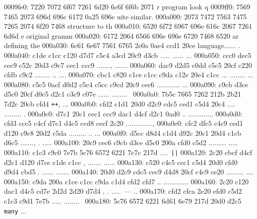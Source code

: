 \begin{bo
00010e0: 7865 647d 5c62 6567 696e 7b76 6572 6261  xed}
\begin{verba
00010f0: 7469 6d7d 0a20 2023 7479 7065 2074 6572  tim}
\begin{
0001c40: 7665 7262 6174 696d 7d0a 2020 236c 6574  verbatim}
\begin{boxe
00027a0: 647d 5c62 6567 696e 7b76 6572 6261 7469  d}
\begin{verbati
00027b0: 6d7d 0a20 2023 6c65 7420 696e 6669 7865  m}
\begin{v
0002c60: 6572 6261 7469 6d7d 0a20 2023 6c65 7420  erbatim}
\begin{
0002dc0: 7665 7262 6174 696d 7d0a 2020 236c 6574  verbatim}
\begin{boxed
0002f30: 7d5c 6265 6769 6e7b 7665 7262 6174 696d  }
\begin{verbatim
0002f40: 7d0a 2020 236c 6574 2068 6428 683a 3a74  }
\begin{v
0003e60: 6572 6261 7469 6d7d 0a20 2023 236f 7065  erbatim}
\begin{boxed
00042b0: 7d5c 6265 6769 6e7b 7665 7262 6174 696d  }
\begin{verbatim
00042c0: 7d0a 2020 2328 782c 7429 3b3b 0a20 202d  }
0009fe0: 7220 7072 6f67 7261 6d20 6c6f 6f6b 2071  r program look q
0009ff0: 7569 7465 2073 696d 696c 6172 0a25 696e  uite similar.%
000a000: 2073 7472 7563 7475 7265 2074 6f20 7468   structure to th
000a010: 6520 6f72 6967 696e 616c 2067 7261 6d6d  e original gramm
000a020: 6172 2064 6566 696e 696e 6720 7468 6520  ar defining the 
000a030: 6c61 6e67 7561 6765 2e0a 0ae4 ccd1 20ce  language...... .
000a040: c1de c1cc c120 d7d7 c5c4 a3cd 20c9 d3cb  ..... ...... ...
000a050: ccc0 dec5 cec9 c52c 20d3 c9c7 cec1 ccc9  ......., .......
000a060: dac9 d2d5 c0dd c5c5 20cf c220 cfdb c9c2  ........ .. ....
000a070: cbc1 c820 c1ce c1cc c9da c12e 20e4 c1cc  ... ........ ...
000a080: c5c5 0acf d0d2 c5c4 c5cc c9cd 20c9 cec6  ............ ...
000a090: c9cb d3ce d5c0 20cf d0c5 d2c1 c3c9 c07e  ...... ........~
000a0a0: 7b5c 7665 7262 212b 2b21 7d2c 20cb cfd4  {\verb!++!}, ...
000a0b0: cfd2 c1d1 20d0 d2c9 cdc5 ced1 c5d4 20c4  .... ......... .
000a0c0: d7c1 20c1 cec1 ccc9 dac1 d4cf d2c1 0ad0  .. .............
000a0d0: cfd3 ccc5 c4cf d7c1 d4c5 ccd8 cecf 2c20  .............., 
000a0e0: cfc2 dfc5 c4c9 ced1 d120 c9c8 20d2 c5da  ......... .. ...
000a0f0: d5cc d8d4 c1d4 d92c 20c1 20d4 c1cb d6c5  ......., . .....
000a100: 20c9 cec6 c9cb d3ce d5c0 200a cfd0 c5d2   ......... .....
000a110: c1c3 c9c0 7e7b 5c76 6572 6221 7c7c 217d  ....~{\verb!||!}
000a120: 2c20 cbcf d4cf d2c1 d120 d7ce c1de c1cc  , ....... ......
000a130: c520 c4c5 ccc1 c5d4 20d0 cfd0 d9d4 cbd5  . ...... .......
000a140: 20d0 d2c9 cdc5 cec9 d4d8 20cf c4c9 ce20   ......... .... 
000a150: c9da 200a c1ce c1cc c9da c1d4 cfd2 cfd7  .. .............
000a160: 2c20 c120 dac1 d4c5 cd7e 2d2d 2d20 d7d4  , . .....~--- ..
000a170: cfd2 cfca 2e20 efd0 c5d2 c1c3 c9d1 7e7b  ..... ........~{
000a180: 5c76 6572 6221 6d61 6e79 217d 20d0 d2c5  \verb!many!} ...

\end{verbatim
00042c0: 7d0a 2020 2328 782c 7429 3b3b 0a20 202d  }
\end{boxed
00042b0: 7d5c 6265 6769 6e7b 7665 7262 6174 696d  }
\end{v
0003e60: 6572 6261 7469 6d7d 0a20 2023 236f 7065  erbatim}
\end{verbatim
0002f40: 7d0a 2020 236c 6574 2068 6428 683a 3a74  }
\end{boxed
0002f30: 7d5c 6265 6769 6e7b 7665 7262 6174 696d  }
\end{
0002dc0: 7665 7262 6174 696d 7d0a 2020 236c 6574  verbatim}
\end{v
0002c60: 6572 6261 7469 6d7d 0a20 2023 6c65 7420  erbatim}
\end{verbati
00027b0: 6d7d 0a20 2023 6c65 7420 696e 6669 7865  m}
\end{boxe
00027a0: 647d 5c62 6567 696e 7b76 6572 6261 7469  d}
\end{
0001c40: 7665 7262 6174 696d 7d0a 2020 236c 6574  verbatim}
\end{verba
00010f0: 7469 6d7d 0a20 2023 7479 7065 2074 6572  tim}
\end{bo
00010e0: 7865 647d 5c62 6567 696e 7b76 6572 6261  xed}

